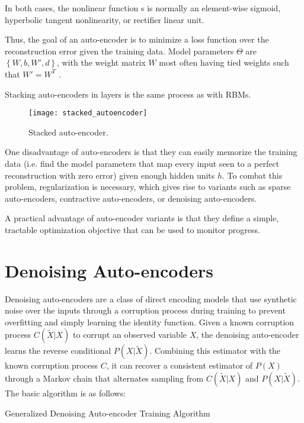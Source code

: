 In both cases, the nonlinear function s is normally an element-wise sigmoid, hyperbolic tangent nonlinearity, or rectifier linear unit.

Thus, the goal of an auto-encoder is to minimize a loss function over the reconstruction error given the training data. Model parameters \(\Theta\) are \(\left\{W,b,W',d\right\}\), with the weight matrix \(W\) most often having tied weights such that \(W' = W^T\) .

Stacking auto-encoders in layers is the same process as with RBMs.
\begin{figure}[h!]
  \centering
    \texttt{[image: stacked\_autoencoder]}
\caption{Stacked auto-encoder.}
\end{figure}

One disadvantage of auto-encoders is that they can easily memorize the training data (i.e. find the model parameters that map every input seen to a perfect reconstruction with zero error) given enough hidden units \(h\). To combat this problem, regularization is necessary, which gives rise to variants such as sparse auto-encoders, contractive auto-encoders, or denoising auto-encoders.

A practical advantage of auto-encoder variants is that they define a simple, tractable optimization objective that can be used to monitor progress.

\section{Denoising Auto-encoders}
Denoising auto-encoders \cite{bengio13a, vincent08, alain12} are a class of direct encoding models that use synthetic noise over the inputs through a corruption process during training to prevent overfitting and simply learning the identity function. Given a known corruption process \(C(\widetilde{X}|X)\) to corrupt an observed variable \(X\), the denoising auto-encoder learns the reverse conditional \(P(X|\widetilde{X})\). Combining this estimator with the known corruption process \(C\), it can recover a consistent estimator of \(P(X)\) through a Markov chain that alternates sampling from \(C(\widetilde{X}|X)\) and \(P(X|\widetilde{X})\). The basic algorithm is as follows:

\begin{algorithm}[h!]
	\caption{ Generalized Denoising Auto-encoder Training Algorithm }
\end{algorithm}

